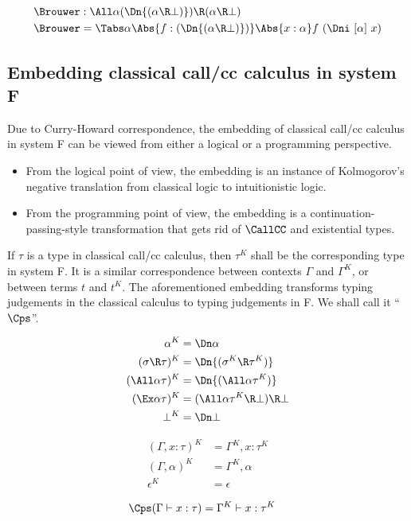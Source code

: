 \documentclass{amsart}
\begin{document}
\begin{align*}
\Brouwer & : \All\alpha (\Dn{(\alpha\R\bot)}) \R (\alpha \R \bot) \\
\Brouwer & = \Tabs\alpha \Abs{f:(\Dn{(\alpha\R\bot)})}
           \Abs{x:\alpha} f~(\Dni~[\alpha]~x)
\end{align*}

\subsection{Embedding classical call/cc calculus in system F}

Due to Curry-Howard correspondence, the embedding of classical
call/cc calculus in system F can be viewed from either a
logical or a programming perspective.
\begin{itemize}
\item From the logical point of view, the embedding is an
instance of Kolmogorov's negative translation from classical
logic to intuitionistic logic.
\item From the programming point of view, the embedding is a
continuation-passing-style transformation that gets rid of
$\CallCC$ and existential types.
\end{itemize}
If $\tau$ is a type in classical call/cc calculus, then $\tau^K$
shall be the corresponding type in system F. It is a similar
correspondence between contexts $\Gamma$ and $\Gamma^K$, or
between terms $t$ and $t^K$. The aforementioned embedding
transforms typing judgements in the classical calculus to typing
judgements in F. We shall call it ``$\Cps$''.

\begin{align*}
\alpha^K & =
  \Dn\alpha
  \\
(\sigma \R \tau)^K & =
  \Dn{(\sigma^K \R \tau^K)}
  \\
(\All\alpha\tau)^K & =
  \Dn{(\All\alpha\tau^K)}
  \\
(\Ex\alpha\tau)^K & =
  (\All\alpha \tau^K \R \bot) \R \bot
  \\
\bot^K & =
  \Dn\bot
\end{align*}

\begin{align*}
(\Gamma, x:\tau)^K & =
  \Gamma^K, x:\tau^K
  \\
(\Gamma, \alpha)^K & =
  \Gamma^K, \alpha
  \\
\epsilon^K & =
  \epsilon
\end{align*}

\begin{align*}
\Cps(\Gamma \vdash x : \tau) & =
  \Gamma^K \vdash x : \tau^K
\end{align*}
\end{document}

